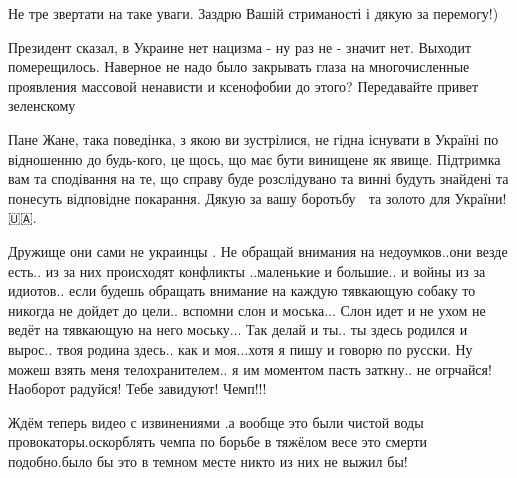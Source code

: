 \begin{itemize}
 

Не тре звертати на таке уваги. Заздрю Вашій стриманості і дякую за перемогу!)


Президент сказал, в Украине нет нацизма - ну раз не - значит нет. Выходит
померещилось. Наверное не надо было закрывать глаза на многочисленные проявления
массовой ненависти и ксенофобии до этого? Передавайте привет зеленскому


Пане Жане, така поведінка, з якою ви зустрілися, не гідна існувати в Україні по
відношенню до будь-кого, це щось, що має бути винищене як явище. Підтримка вам
та сподівання на те, що справу буде розслідувано та винні будуть знайдені та
понесуть відповідне покарання. Дякую за вашу боротьбу 💪 та золото для
України!🇺🇦.


Дружище они сами не украинцы . Не обращай внимания на недоумков..они везде
есть.. из за них происходят конфликты ..маленькие и большие.. и войны из за
идиотов.. если будешь обращать внимание на каждую тявкающую собаку то никогда
не дойдет до цели.. вспомни слон и моська... Слон идет и не ухом не ведёт на
тявкающую на него моську... Так делай и ты.. ты здесь родился и вырос.. твоя
родина здесь.. как и моя...хотя я пишу и говорю по русски. Ну можеш взять меня
телохранителем.. я им моментом пасть заткну.. не огрчайся! Наоборот радуйся!
Тебе завидуют! Чемп!!!


Ждём теперь видео с извинениями .а вообще это были чистой воды
провокаторы.оскорблять чемпа по борьбе в тяжёлом весе это смерти подобно.было
бы это в темном месте никто из них не выжил бы!


\end{itemize}
